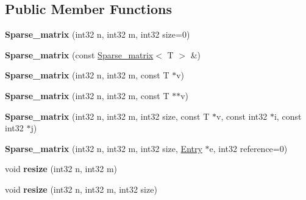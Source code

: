 \subsection*{\-Public \-Member \-Functions}
\begin{DoxyCompactItemize}
\item 
\hypertarget{structnih_1_1_sparse__matrix_a03687e3f719b5d0f105a8d286ee298bf}{
{\bfseries \-Sparse\-\_\-matrix} (int32 n, int32 m, int32 size=0)}
\label{structnih_1_1_sparse__matrix_a03687e3f719b5d0f105a8d286ee298bf}

\item 
\hypertarget{structnih_1_1_sparse__matrix_ad57d05c335b7f530c018c136a464999e}{
{\bfseries \-Sparse\-\_\-matrix} (const \hyperlink{structnih_1_1_sparse__matrix}{\-Sparse\-\_\-matrix}$<$ \-T $>$ \&)}
\label{structnih_1_1_sparse__matrix_ad57d05c335b7f530c018c136a464999e}

\item 
\hypertarget{structnih_1_1_sparse__matrix_ad4fc54442571a61a95242502535cf27f}{
{\bfseries \-Sparse\-\_\-matrix} (int32 n, int32 m, const \-T $\ast$v)}
\label{structnih_1_1_sparse__matrix_ad4fc54442571a61a95242502535cf27f}

\item 
\hypertarget{structnih_1_1_sparse__matrix_a8a90b60998442bdd4cacd71b9599b2d3}{
{\bfseries \-Sparse\-\_\-matrix} (int32 n, int32 m, const \-T $\ast$$\ast$v)}
\label{structnih_1_1_sparse__matrix_a8a90b60998442bdd4cacd71b9599b2d3}

\item 
\hypertarget{structnih_1_1_sparse__matrix_a8f41367ba24b99d56a008783b67fb5cd}{
{\bfseries \-Sparse\-\_\-matrix} (int32 n, int32 m, int32 size, const \-T $\ast$v, const int32 $\ast$i, const int32 $\ast$j)}
\label{structnih_1_1_sparse__matrix_a8f41367ba24b99d56a008783b67fb5cd}

\item 
\hypertarget{structnih_1_1_sparse__matrix_abfff909ffb5aa4477675ead6818067a5}{
{\bfseries \-Sparse\-\_\-matrix} (int32 n, int32 m, int32 size, \hyperlink{structnih_1_1_sparse__matrix__entry}{\-Entry} $\ast$e, int32 reference=0)}
\label{structnih_1_1_sparse__matrix_abfff909ffb5aa4477675ead6818067a5}

\item 
\hypertarget{structnih_1_1_sparse__matrix_ae2941169e3b76cf8b83dd50347c00e76}{
void {\bfseries resize} (int32 n, int32 m)}
\label{structnih_1_1_sparse__matrix_ae2941169e3b76cf8b83dd50347c00e76}

\item 
\hypertarget{structnih_1_1_sparse__matrix_ab6fb9bf29adddc3ae697dfbc44d39995}{
void {\bfseries resize} (int32 n, int32 m, int32 size)}
\label{structnih_1_1_sparse__matrix_ab6fb9bf29adddc3ae697dfbc44d39995}


\end{DoxyCompactItemize}
